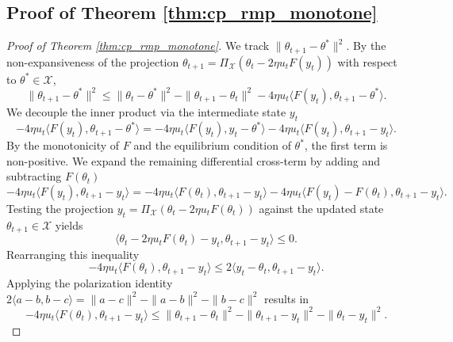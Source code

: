 \documentclass[letter,11pt]{article}
\begin{document}
\subsection{Proof of Theorem \ref{thm:cp_rmp_monotone}}\label{sec:cp_rmp_monotone}
\begin{proof}[Proof of Theorem \ref{thm:cp_rmp_monotone}]
We track $\|\theta_{t+1} - \theta^*\|^2$. By the non-expansiveness of the projection $\theta_{t+1} = \Pi_{\mathcal{X}}(\theta_t - 2\eta u_t F(y_t))$ with respect to $\theta^* \in \mathcal{X}$,
\begin{equation} \label{eq:cp_rmp_distance_expansion}
\|\theta_{t+1} - \theta^*\|^2 \le \|\theta_t - \theta^*\|^2 - \|\theta_{t+1} - \theta_t\|^2 - 4\eta u_t \langle F(y_t), \theta_{t+1} - \theta^* \rangle.
\end{equation}
We decouple the inner product via the intermediate state $y_t$
\begin{equation} \label{eq:cp_rmp_inner_product_split}
-4\eta u_t \langle F(y_t), \theta_{t+1} - \theta^* \rangle = -4\eta u_t \langle F(y_t), y_t - \theta^* \rangle - 4\eta u_t \langle F(y_t), \theta_{t+1} - y_t \rangle.
\end{equation}
By the monotonicity of $F$ and the equilibrium condition of $\theta^*$, the first term is non-positive. We expand the remaining differential cross-term by adding and subtracting $F(\theta_t)$
\begin{equation}\label{proof:thm4:diff-crossterm}
-4\eta u_t \langle F(y_t), \theta_{t+1} - y_t \rangle = -4\eta u_t \langle F(\theta_t), \theta_{t+1} - y_t \rangle - 4\eta u_t \langle F(y_t) - F(\theta_t), \theta_{t+1} - y_t \rangle.
\end{equation}
Testing the projection $y_t = \Pi_{\mathcal{X}}(\theta_t - 2\eta u_t F(\theta_t))$ against the updated state $\theta_{t+1} \in \mathcal{X}$ yields
\begin{equation}
\langle \theta_t - 2\eta u_t F(\theta_t) - y_t, \theta_{t+1} - y_t \rangle \le 0.
\end{equation}
Rearranging this inequality
\begin{equation}
-4\eta u_t \langle F(\theta_t), \theta_{t+1} - y_t \rangle \le 2\langle y_t - \theta_t, \theta_{t+1} - y_t \rangle.
\end{equation}
Applying the polarization identity $2\langle a-b, b-c \rangle = \|a-c\|^2 - \|a-b\|^2 - \|b-c\|^2$ results in
\begin{equation}\label{proof:thm4:polarization}
-4\eta u_t \langle F(\theta_t), \theta_{t+1} - y_t \rangle \le \|\theta_{t+1} - \theta_t\|^2 - \|\theta_{t+1} - y_t\|^2 - \|\theta_t - y_t\|^2.

\end{equation}
\end{proof}
\end{document}
